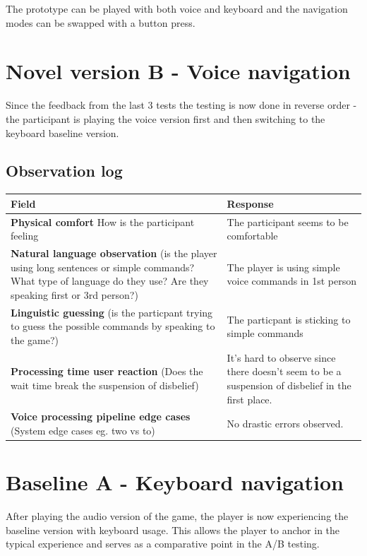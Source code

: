 The prototype can be played with both voice and keyboard and the navigation modes can be swapped with a button press. 


\section{Novel version B - Voice navigation}

Since the feedback from the last 3 tests the testing is now done in reverse order - the participant is playing the voice version first and then switching to the keyboard baseline version.


\subsection{Observation log}
\begin{table}[H]
\centering
\begin{tabular}{|p{5cm}|p{10cm}|}
\hline
\textbf{Field} & \textbf{Response} \\ \hline
\textbf{Physical comfort} How is the participant feeling & The participant seems to be comfortable \\[1.5cm] \hline
\textbf{Natural language observation} (is the player using long sentences or simple commands? What type of language do they use? Are they speaking first or 3rd person?) &The player is using simple voice commands in 1st person\\[1.5cm] \hline
\textbf{Linguistic guessing} (is the particpant trying to guess the possible commands by speaking to the game?) &The particpant is sticking to simple commands \\[1.5cm] \hline
\textbf{Processing time user reaction} (Does the wait time break the suspension of disbelief) & It's hard to observe since there doesn't seem to be a suspension of disbelief in the first place.\\[1.5cm] \hline
\textbf{Voice processing pipeline edge cases} (System edge cases eg. two vs to)& No drastic errors observed.\\[1.5cm] \hline
\end{tabular}
\end{table}


\section{Baseline A - Keyboard navigation}
After playing the audio version of the game, the player is now experiencing the baseline version with keyboard usage.
This allows the player to anchor in the typical experience and serves as a comparative point in the A/B testing.

